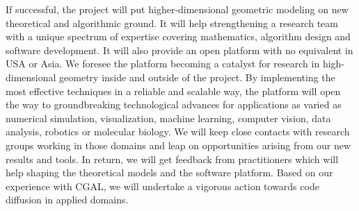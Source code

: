 If successful, the project will put higher-dimensional geometric modeling on new theoretical and algorithmic ground. It will help strengthening a research team with a unique spectrum of expertise covering mathematics, algorithm design and software development.
It will also provide an open platform with no equivalent in USA or Asia. We foresee the platform becoming a catalyst for research in high-dimensional geometry inside and outside of the project.  
By implementing the most effective techniques in a  reliable and scalable way, the platform will
open the way to groundbreaking technological advances for applications as varied as numerical simulation, visualization, machine  learning, computer vision, data analysis, robotics or molecular biology.
We will keep close contacts with research groups working in those domains and leap on opportunities arising from our new results and tools.
 In return, we will get feedback from practitioners which will help shaping the theoretical models and the software platform. Based on our experience with CGAL, we will undertake a vigorous action towards code diffusion in applied domains.





